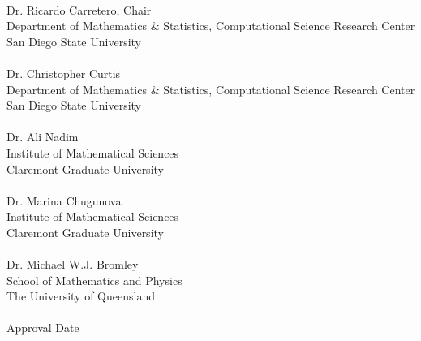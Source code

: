 \documentclass[11pt]{Thesis} %
\begin{document}
      \begin{center}
      \HRulee \\ %
      Dr. Ricardo Carretero, Chair \\
      Department of Mathematics \& Statistics, Computational Science Research Center \\
      San Diego State University \\[1.2cm]
      
       \HRulee \\ %
      Dr. Christopher Curtis \\
      Department of Mathematics \& Statistics, Computational Science Research Center \\
      San Diego State University \\[1.2cm]
      
      \HRulee \\ %
      Dr. Ali Nadim \\
     Institute of Mathematical Sciences \\
      Claremont Graduate University \\[1.2cm]
      
       \HRulee \\%
      Dr. Marina Chugunova \\
      Institute of Mathematical Sciences \\
      Claremont Graduate University \\[1.2cm]
 
      \HRulee \\ %
      Dr. Michael W.J. Bromley \\
      School of Mathematics and Physics \\
      The University of Queensland \\[1.2cm]
      
        \hRule \\
        Approval Date
      
  
 \end{center}
\end{document}

